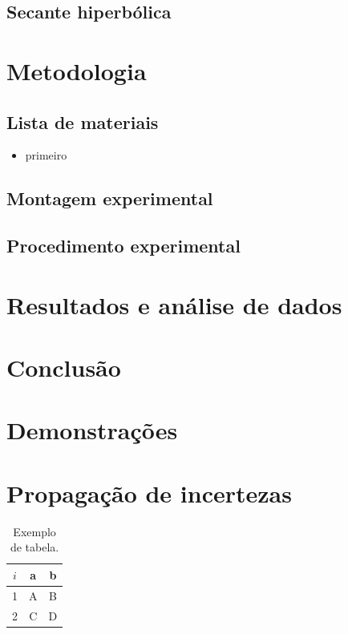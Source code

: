 \documentclass[report,14pt,openright,oneside,a4paper,brazil]{abntex2}
\begin{document}
\section{Secante hiperbólica}

\chapter{Metodologia}

\section{Lista de materiais}

\begin{itemize}
    \item primeiro
\end{itemize}

\section{Montagem experimental}

\section{Procedimento experimental}

\chapter{Resultados e análise de dados}

\chapter{Conclusão}

\newpage
\appendix

\newpage



\nocite{*}

\chapter{Demonstrações}

\chapter{Propagação de incertezas}

\begin{table}[H]
    \centering
    \begin{tabular}{|c|c|c|}
         \hline
         $i$ & a & b \\
         \hline
         1 & A & B \\
         2 & C & D \\
         \hline
    \end{tabular}
    \caption{Exemplo de tabela.}
    \label{tab:ex}
\end{table}
\end{document}
